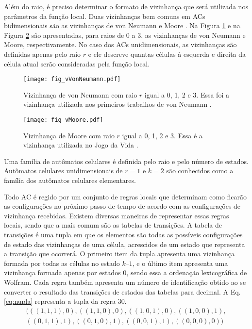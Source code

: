 Além do raio, é preciso determinar o formato de vizinhança que será utilizada nos parâmetros da função local. Duas vizinhanças bem comuns em ACs bidimensionais são as vizinhanças de von Neumann \cite{weisstein2015b} e Moore \cite{weisstein2015c}. Na Figura \ref{fig:vVonNeumann} e na Figura \ref{fig:vMoore} são apresentadas, para raios de 0 a 3, as vizinhanças de von Neumann e Moore, respectivamente. No caso dos ACs unidimensionais, as vizinhanças são definidas apenas pelo raio $r$ e ele descreve quantas células à esquerda e direita da célula atual serão consideradas pela função local.

	\begin{figure}[h!]
	  \centering
	  \texttt{[image: fig\_vVonNeumann.pdf]}
	  \caption{Vizinhança de von Neumann com raio $r$ igual a 0, 1, 2 e 3. Essa foi a vizinhança utilizada nos primeiros trabalhos de von Neumann \cite{weisstein2015b}.}
	  \label{fig:vVonNeumann}
	\end{figure}

	\begin{figure}[h!]
	  \centering
  	  \texttt{[image: fig\_vMoore.pdf]}
	  \caption{Vizinhança de Moore com raio $r$ igual a 0, 1, 2 e 3. Essa é a vizinhança utilizada no Jogo da Vida \cite{weisstein2015c}.}
	  \label{fig:vMoore}
	\end{figure}

Uma família de autômatos celulares é definida pelo raio e pelo número de estados. Autômatos celulares unidimensionais de $r=1$ e $k=2$ são conhecidos como a família dos autômatos celulares elementares.

Todo AC é regido por um conjunto de regras locais que determinam como ficarão as configurações no próximo passo de tempo de acordo com as configurações de vizinhança recebidas. Existem diversas maneiras de representar essas regras locais, sendo que a mais comum são as tabelas de transições. A tabela de transições é uma tupla em que os elementos são todas as possíveis configurações de estado das vizinhanças de uma célula, acrescidos de um estado que representa a transição que ocorrerá. O primeiro item da tupla apresenta uma vizinhança formada por todas as células no estado $k – 1$, e o último item apresenta uma vizinhança formada apenas por estados $0$, sendo essa a ordenação lexicográfica de Wolfram. Cada regra também apresenta um número de identificação obtido ao se converter o resultado das transições de estados das tabelas para decimal. A Eq. \eqref{eq:nupla} representa a tupla da regra 30.
	\begin{equation}
	\begin{split}
	(((1,1,1),0),((1,1,0),0),((1,0,1),0),((1,0,0),1),\\
	((0,1,1),1),((0,1,0),1),((0,0,1),1),((0,0,0),0))
	\label{eq:nupla}
	\end{split}
	\end{equation}

